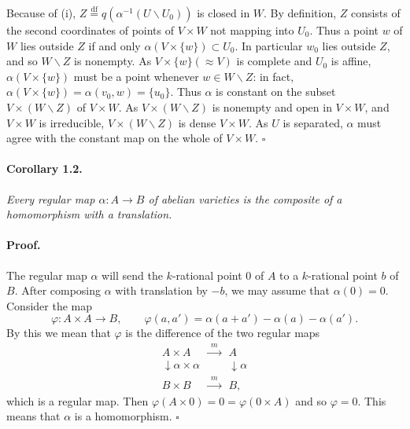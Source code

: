 

Because of (i), $Z \overset{\mathrm{df}}{=} q(\alpha^{-1}(U \smallsetminus U_0))$
is closed in $W$. By definition, $Z$ consists of the second coordinates of
points of $V \times W$ not mapping into $U_0$. Thus a point $w$ of $W$ lies
outside $Z$ if and only $\alpha(V \times \{w\}) \subset U_0$. In particular
$w_0$ lies outside $Z$, and so $W \smallsetminus Z$ is nonempty. As
$V \times \{w\} (\approx V)$ is complete and $U_0$ is affine,
$\alpha(V \times \{w\})$ must be a point whenever $w \in W \smallsetminus Z$:
in fact, $\alpha(V \times \{w\}) = \alpha(v_0, w) = \{u_0\}$. Thus $\alpha$
is constant on the subset $V \times (W \smallsetminus Z)$ of $V \times W$.
As $V \times (W \smallsetminus Z)$ is nonempty and open in $V \times W$, and
$V \times W$ is irreducible, $V \times (W \smallsetminus Z)$ is dense
$V \times W$. As $U$ is separated, $\alpha$ must agree with the constant map
on the whole of $V \times W$. \hfill $\square$

\paragraph{Corollary 1.2.}
\textit{Every regular map $\alpha : A \to B$ of abelian varieties is the
composite of a homomorphism with a translation.}

\paragraph{Proof.}
The regular map $\alpha$ will send the $k$-rational point $0$ of $A$ to a
$k$-rational point $b$ of $B$. After composing $\alpha$ with translation by
$-b$, we may assume that $\alpha(0) = 0$. Consider the map
\[
  \varphi : A \times A \to B, \qquad
  \varphi(a, a') = \alpha(a + a') - \alpha(a) - \alpha(a').
\]
By this we mean that $\varphi$ is the difference of the two regular maps
\[
  \begin{array}{ccc}
    A \times A & \xrightarrow{\;m\;} & A \\
    \downarrow \scriptstyle{\alpha \times \alpha} & & \downarrow \scriptstyle{\alpha} \\
    B \times B & \xrightarrow{\;m\;} & B,
  \end{array}
\]
which is a regular map. Then $\varphi(A \times 0) = 0 = \varphi(0 \times A)$
and so $\varphi = 0$. This means that $\alpha$ is a homomorphism.
\hfill $\square$

